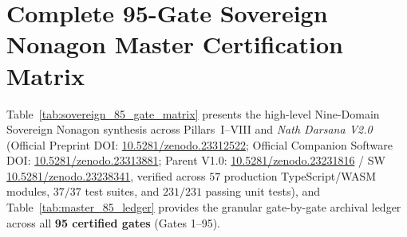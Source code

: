 \documentclass[11pt,a4paper,reqno]{article}
\def\texttt#1{#1}%
\newcommand{\zenodo}[1]{\href{https://doi.org/10.5281/zenodo.#1}{\texttt{10.5281/\allowbreak zenodo.#1}}}
\theoremstyle{plain}
\theoremstyle{definition}
\theoremstyle{remark}
\numberwithin{equation}{section}
\begin{document}
\section{Complete 95-Gate Sovereign Nonagon Master Certification Matrix}
\label{sec:sovereign_nonagon_master_matrix}

Table~\ref{tab:sovereign_85_gate_matrix} presents the high-level Nine-Domain Sovereign Nonagon synthesis across Pillars~I--VIII and \emph{Nath Darsana V2.0} (Official Preprint DOI: \zenodo{23312522}; Official Companion Software DOI: \zenodo{23313881}; Parent V1.0: \zenodo{23231816} / SW \zenodo{23238341}, verified across $57$ production TypeScript/WASM modules, $37/37$ test suites, and $231/231$ passing unit tests), and Table~\ref{tab:master_85_ledger} provides the granular gate-by-gate archival ledger across all \textbf{95 certified gates} (\texttt{Gates 1--95}).
\end{document}
